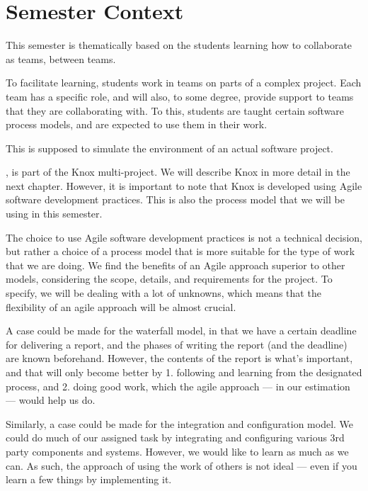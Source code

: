 \section{Semester Context}
This semester is thematically based on the students learning how to collaborate as teams, between teams.

To facilitate learning, students work in teams on parts of a complex project. 
Each team has a specific role, and will also, to some degree, provide support to teams that they are collaborating with.
To this, students are taught certain software process models, and are expected to use them in their work.

This is supposed to simulate the environment of an actual software project.

, is part of the Knox multi-project.
We will describe Knox in more detail in the next chapter.
However, it is important to note that Knox is developed using Agile software development practices.
This is also the process model that we will be using in this semester.

The choice to use Agile software development practices is not a technical decision, but rather a choice of a process model that is more suitable for the type of work that we are doing.
We find the benefits of an Agile approach superior to other models, considering the scope, details, and requirements for the project.
To specify, we will be dealing with a lot of unknowns, which means that the flexibility of an agile approach will be almost crucial.

A case could be made for the waterfall model, in that we have a certain deadline for delivering a report, and the phases of writing the report (and the deadline) are known beforehand. 
However, the contents of the report is what's important, and that will only become better by 1. following and learning from the designated process, and 2. doing good work, which the agile approach — in our estimation — would help us do.

Similarly, a case could be made for the integration and configuration model.
We could do much of our assigned task by integrating and configuring various 3rd party components and systems. 
However, we would like to learn as much as we can. 
As such, the approach of using the work of others is not ideal — even if you learn a few things by implementing it.